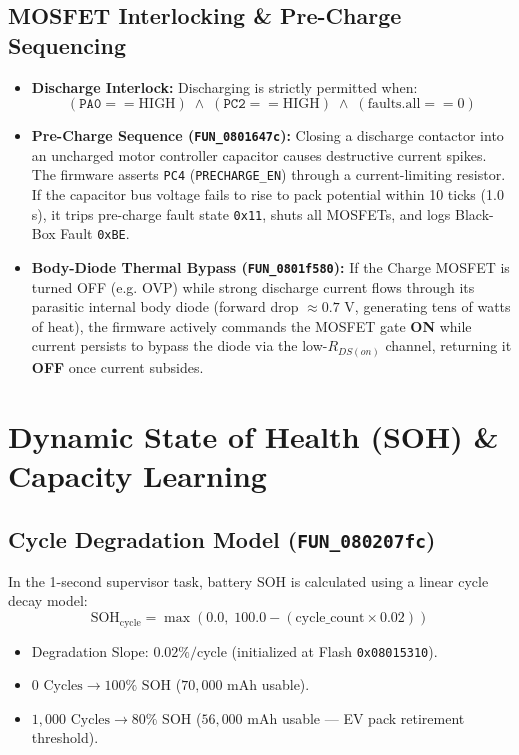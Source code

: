 \documentclass[10pt,a4paper]{article}
\begin{document}
\subsection{MOSFET Interlocking \& Pre-Charge Sequencing}
\begin{itemize}
    \item \textbf{Discharge Interlock:} Discharging is strictly permitted when:
    \begin{equation}
        (\texttt{PA0} == \text{HIGH}) \;\land\; (\texttt{PC2} == \text{HIGH}) \;\land\; (\text{faults.all} == 0)
    \end{equation}
    \item \textbf{Pre-Charge Sequence (\texttt{FUN\_0801647c}):} Closing a discharge contactor into an uncharged motor controller capacitor causes destructive current spikes. The firmware asserts \texttt{PC4} (\texttt{PRECHARGE\_EN}) through a current-limiting resistor. If the capacitor bus voltage fails to rise to pack potential within 10 ticks (1.0 s), it trips pre-charge fault state \texttt{0x11}, shuts all MOSFETs, and logs Black-Box Fault \texttt{0xBE}.
    \item \textbf{Body-Diode Thermal Bypass (\texttt{FUN\_0801f580}):} If the Charge MOSFET is turned OFF (e.g. OVP) while strong discharge current flows through its parasitic internal body diode (forward drop $\approx 0.7\text{ V}$, generating tens of watts of heat), the firmware actively commands the MOSFET gate \textbf{ON} while current persists to bypass the diode via the low-$R_{DS(on)}$ channel, returning it \textbf{OFF} once current subsides.
\end{itemize}

\section{Dynamic State of Health (SOH) \& Capacity Learning}

\subsection{Cycle Degradation Model (\texttt{FUN\_080207fc})}
In the 1-second supervisor task, battery SOH is calculated using a linear cycle decay model:
\begin{equation}
    \text{SOH}_{\text{cycle}} = \max\left(0.0,\; 100.0 - (\text{cycle\_count} \times 0.02)\right)
\end{equation}
\begin{itemize}
    \item Degradation Slope: $0.02\% / \text{cycle}$ (initialized at Flash \texttt{0x08015310}).
    \item $0\text{ Cycles} \rightarrow 100\%\text{ SOH}$ ($70,000\text{ mAh}$ usable).
    \item $1,000\text{ Cycles} \rightarrow 80\%\text{ SOH}$ ($56,000\text{ mAh}$ usable --- EV pack retirement threshold).
\end{itemize}
\end{document}
